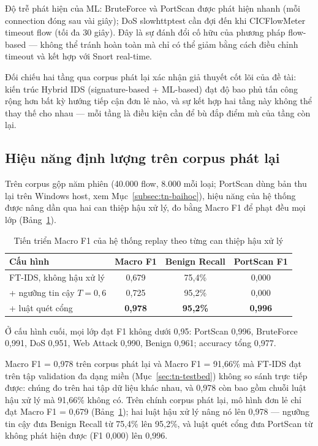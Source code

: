 \documentclass[../DoAn.tex]{subfiles}
\begin{document}
Độ trễ phát hiện của ML: BruteForce và PortScan được phát hiện nhanh (mỗi connection đóng sau vài giây); DoS slowhttptest cần đợi đến khi CICFlowMeter timeout flow (tối đa 30 giây). Đây là sự đánh đổi cố hữu của phương pháp flow-based --- không thể tránh hoàn toàn mà chỉ có thể giảm bằng cách điều chỉnh timeout và kết hợp với Snort real-time.

Đối chiếu hai tầng qua corpus phát lại xác nhận giả thuyết cốt lõi của đề tài: kiến trúc Hybrid IDS (signature-based + ML-based) đạt độ bao phủ tấn công rộng hơn bất kỳ hướng tiếp cận đơn lẻ nào, và sự kết hợp hai tầng này không thể thay thế cho nhau --- mỗi tầng là điều kiện cần để bù đắp điểm mù của tầng còn lại.

\subsection{Hiệu năng định lượng trên corpus phát lại}
\label{subsec:tn-replay-quant}

Trên corpus gộp năm phiên (40.000 flow, 8.000 mỗi loại; PortScan dùng bản thu lại trên Windows host, xem Mục~\ref{subsec:tn-baihoc}), hiệu năng của hệ thống được nâng dần qua hai can thiệp hậu xử lý, đo bằng Macro F1 để phạt đều mọi lớp (Bảng~\ref{tab:replay-progress}).

\begin{table}[H]
    \centering
    \caption{Tiến triển Macro F1 của hệ thống replay theo từng can thiệp hậu xử lý}
    \label{tab:replay-progress}
    \begin{tabular}{lccc}
        \hline
        \textbf{Cấu hình} & \textbf{Macro F1} & \textbf{Benign Recall} & \textbf{PortScan F1} \\
        \hline
        FT-IDS, không hậu xử lý                     & 0,679 & 75,4\% & 0,000 \\
        \quad + ngưỡng tin cậy $T=0{,}6$          & 0,725 & 95,2\% & 0,000 \\
        \quad + luật quét cổng                    & \textbf{0,978} & \textbf{95,2\%} & \textbf{0,996} \\
        \hline
    \end{tabular}
\end{table}

Ở cấu hình cuối, mọi lớp đạt F1 không dưới 0,95: PortScan 0,996, BruteForce 0,991, DoS 0,951, Web Attack 0,990, Benign 0,961; accuracy tổng 0,977.

Macro F1 = 0,978 trên corpus phát lại và Macro F1 = 91,66\% mà FT-IDS đạt trên tập validation đa dạng miền (Mục~\ref{sec:tn-testbed}) không so sánh trực tiếp được: chúng đo trên hai tập dữ liệu khác nhau, và 0,978 còn bao gồm chuỗi luật hậu xử lý mà 91,66\% không có. Trên chính corpus phát lại, mô hình đơn lẻ chỉ đạt Macro F1 = 0,679 (Bảng~\ref{tab:replay-progress}); hai luật hậu xử lý nâng nó lên 0,978 --- ngưỡng tin cậy đưa Benign Recall từ 75,4\% lên 95,2\%, và luật quét cổng đưa PortScan từ không phát hiện được (F1 0,000) lên 0,996.
\end{document}

